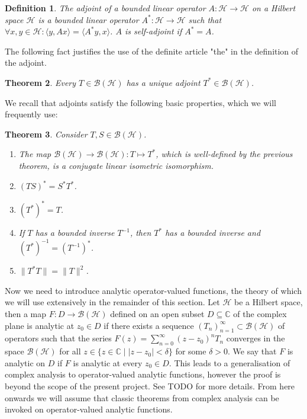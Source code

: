 \documentclass[12pt,oneside]{report}
\newtheorem{thm}{Theorem}[chapter]
\newtheorem{defn}[thm]{Definition}
\begin{document}
\begin{defn}
    The adjoint of a bounded linear operator $A: \mathscr{H} \to \mathscr{H}$ on a Hilbert space $\mathscr{H}$ is a bounded linear operator $A^{*}: \mathscr{H} \to \mathscr{H}$ such that $\forall x,y \in \mathscr{H}: \langle y,Ax \rangle = \langle A^{*}y, x \rangle$. $A$ is self-adjoint if $A^{*} = A$.
\end{defn}

The following fact justifies the use of the definite article "the" in the definition of the adjoint.

\begin{thm}
    Every $T \in \mathscr{B}(\mathscr{H})$ has a unique adjoint $T^{*} \in \mathscr{B}(\mathscr{H})$.
\end{thm}

We recall that adjoints satisfy the following basic properties, which we will frequently use:

\begin{thm}
    Consider $T, S \in \mathscr{B}(\mathscr{H})$.
    \begin{enumerate}
        \item[a)] The map $\mathscr{B}(\mathscr{H}) \to \mathscr{B}(\mathscr{H}): T \mapsto T^{*}$, which is well-defined by the previous theorem, is a conjugate linear isometric isomorphism.
        \item[b)] $(TS)^{*} = S^{*}T^{*}$.
        \item[c)] $(T^{*})^{*} = T$.
        \item[d)] If $T$ has a bounded inverse $T^{-1}$, then $T^{*}$ has a bounded inverse and $(T^{*})^{-1} = (T^{-1})^{*}$.
        \item[e)] $\|T^{*}T\| = \|T\|^{2}$.
    \end{enumerate}
\end{thm}

Now we need to introduce analytic operator-valued functions, the theory of which we will use extensively in the remainder of this section. Let $\mathscr{H}$ be a Hilbert space, then a map $F: D \to \mathscr{B}(\mathscr{H})$ defined on an open subset $D \subseteq \mathbb{C}$ of the complex plane is analytic at $z_{0} \in D$ if there exists a sequence $(T_{n})_{n=1}^{\infty} \subset \mathscr{B}(\mathscr{H})$ of operators such that the series $F(z) = \sum_{n=0}^{\infty} (z - z_{0})^{n}T_{n}$ converges in the space $\mathscr{B}(\mathscr{H})$ for all $z \in \{ z \in \mathbb{C} \; | \; |z - z_{0}| < \delta \}$ for some $\delta > 0$. We say that $F$ is analytic on $D$ if $F$ is analytic at every $z_{0} \in D$. This leads to a generalisation of complex analysis to operator-valued analytic functions, however the proof is beyond the scope of the present project. See TODO for more details. From here onwards we will assume that classic theorems from complex analysis can be invoked on operator-valued analytic functions.
\end{document}
